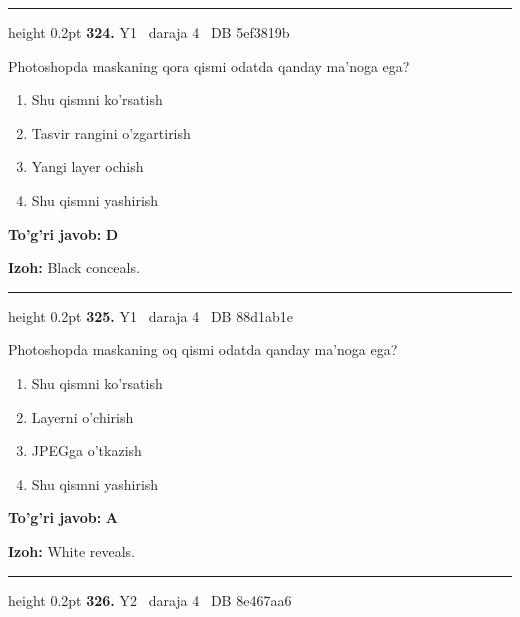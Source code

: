 \documentclass[10pt,a4paper,oneside]{article}
\begin{document}
\vspace{2mm}\hrule height 0.2pt \vspace{4mm}
\hypertarget{q324}{\textbf{\color{ink}324.}}  {\color{muted}\scriptsize Y1 \textbullet\ daraja 4 \textbullet\ DB 5ef3819b}
\par
Photoshopda maskaning qora qismi odatda qanday ma'noga ega?
\begin{enumerate}[label=\Alph*),leftmargin=9mm]
\item Shu qismni ko'rsatish
\item Tasvir rangini o'zgartirish
\item Yangi layer ochish
\item Shu qismni yashirish
\end{enumerate}
\begin{tcolorbox}[enhanced,breakable,colback=teal!4,colframe=teal!45!black,boxrule=0.45pt,arc=1.2mm,left=2.8mm,right=2.8mm,top=2mm,bottom=2mm,before skip=2mm,after skip=2mm]
\textbf{\color{teal}To'g'ri javob:} \textbf{D}
\par\smallskip
\textbf{Izoh:} Black conceals.
\end{tcolorbox}
\vspace{2mm}\hrule height 0.2pt \vspace{4mm}
\hypertarget{q325}{\textbf{\color{ink}325.}}  {\color{muted}\scriptsize Y1 \textbullet\ daraja 4 \textbullet\ DB 88d1ab1e}
\par
Photoshopda maskaning oq qismi odatda qanday ma'noga ega?
\begin{enumerate}[label=\Alph*),leftmargin=9mm]
\item Shu qismni ko'rsatish
\item Layerni o'chirish
\item JPEGga o'tkazish
\item Shu qismni yashirish
\end{enumerate}
\begin{tcolorbox}[enhanced,breakable,colback=teal!4,colframe=teal!45!black,boxrule=0.45pt,arc=1.2mm,left=2.8mm,right=2.8mm,top=2mm,bottom=2mm,before skip=2mm,after skip=2mm]
\textbf{\color{teal}To'g'ri javob:} \textbf{A}
\par\smallskip
\textbf{Izoh:} White reveals.
\end{tcolorbox}
\vspace{2mm}\hrule height 0.2pt \vspace{4mm}
\hypertarget{q326}{\textbf{\color{ink}326.}}  {\color{muted}\scriptsize Y2 \textbullet\ daraja 4 \textbullet\ DB 8e467aa6}
\end{document}
